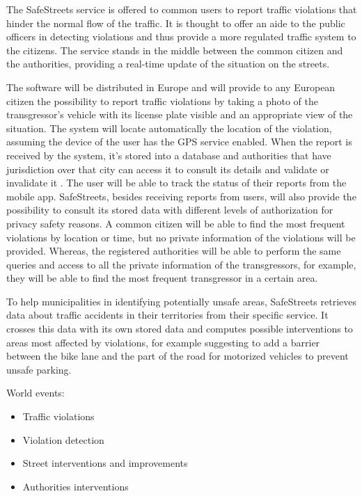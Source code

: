 The SafeStreets service is offered to common users to report traffic violations that hinder the normal flow of the traffic. It is thought to offer an aide to the public officers in detecting violations and thus provide a more regulated traffic system to the citizens. The service stands in the middle between the common citizen and the authorities, providing a real-time update of the situation on the streets.

The software will be distributed in Europe and will provide to any European citizen the possibility to report traffic violations by taking a photo of the transgressor's vehicle with its license plate visible and an appropriate view of the situation. The system will locate automatically the location of the violation, assuming the device of the user has the GPS service enabled. When the report is received by the system, it's stored into a database and authorities that have jurisdiction over that city can access it to consult its details and validate or invalidate it . The user will be able to track the status of their reports from the mobile app. SafeStreets, besides receiving reports from users, will also provide the possibility to consult its stored data with different levels of authorization for privacy safety reasons. A common citizen will be able to find the most frequent violations by location or time, but no private information of the violations will be provided. Whereas, the registered authorities will be able to perform the same queries and access to all the private information of the transgressors, for example, they will be able to find the most frequent transgressor in a certain area.

To help municipalities in identifying potentially unsafe areas, SafeStreets retrieves data about traffic accidents in their territories from their specific service. It crosses this data with its own stored data and computes possible interventions to areas most affected by violations, for example suggesting to add a barrier between the bike lane and the part of the road for motorized vehicles to prevent unsafe parking.


World events:
\begin{itemize}
    \item Traffic violations
    \item Violation detection
    \item Street interventions and improvements
    \item Authorities interventions
\end{itemize}


